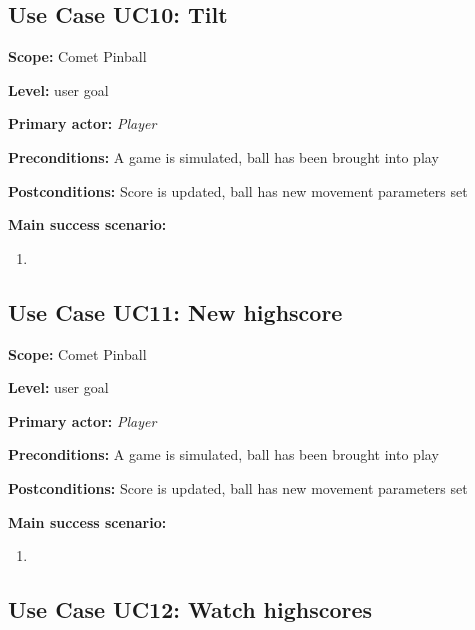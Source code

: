 \documentclass[fontsize=12pt,
               paper=a4,
               twoside=false,
               parskip=half,
               ]{scrartcl}
\begin{document}


\subsection{Use Case UC10: Tilt}

\textbf{\textsf{Scope:}} Comet Pinball

\textbf{\textsf{Level:}} user goal

\textbf{\textsf{Primary actor:}} \emph{Player}

\textbf{\textsf{Preconditions:}} A game is simulated, ball has been brought into play

\textbf{\textsf{Postconditions:}} Score is updated, ball has new movement parameters set

\textbf{\textsf{Main success scenario:}}

\begin{enumerate}[leftmargin=3em]
	\item 
\end{enumerate}




\subsection{Use Case UC11: New highscore}

\textbf{\textsf{Scope:}} Comet Pinball

\textbf{\textsf{Level:}} user goal

\textbf{\textsf{Primary actor:}} \emph{Player}

\textbf{\textsf{Preconditions:}} A game is simulated, ball has been brought into play

\textbf{\textsf{Postconditions:}} Score is updated, ball has new movement parameters set

\textbf{\textsf{Main success scenario:}}

\begin{enumerate}[leftmargin=3em]
	\item 
\end{enumerate}




\subsection{Use Case UC12: Watch highscores }
\end{document}
